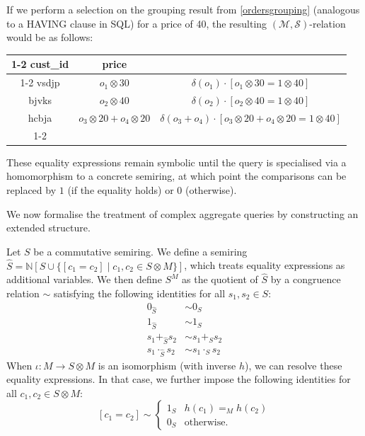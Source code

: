 \documentclass[oneside, 11pt]{amsbook}
\theoremstyle{plain}
\theoremstyle{definition}
\theoremstyle{remark}
\begin{document}
\begin{exmpl}
    \label{ordersgroupingselect}
    If we perform a selection on the grouping result from \autoref{ordersgrouping} (analogous to a HAVING clause in SQL) for a price of 40, the resulting $(\mathcal{M}, \mathcal{S})$-relation would be as follows:

    \begin{center}
        \begin{tabular}{|c|c|c}
            \cline{1-2}
            cust\_id & price                             &                                                                            \\ \cline{1-2}
            vsdjp    & $o_1 \otimes 30$                  & $\delta(o_1)\cdot [o_1 \otimes 30 = 1 \otimes 40]$                         \\
            bjvks    & $o_2 \otimes 40$                  & $\delta(o_2) \cdot [o_2 \otimes 40 = 1 \otimes 40]$                        \\
            hcbja    & $o_3 \otimes 20 + o_4 \otimes 20$ & $\delta(o_3 + o_4) \cdot [o_3 \otimes 20 + o_4 \otimes 20 = 1 \otimes 40]$ \\ \cline{1-2}
        \end{tabular}
    \end{center}

    These equality expressions remain symbolic until the query is specialised via a homomorphism to a concrete semiring, at which point the comparisons can be replaced by $1$ (if the equality holds) or $0$ (otherwise).
\end{exmpl}

We now formalise the treatment of complex aggregate queries by constructing an extended structure.

\begin{defn}[$S^M$]
    Let $S$ be a commutative semiring. We define a semiring $\widehat{S} = \mathbb{N}[S \cup \{ [c_1 = c_2] \mid c_1, c_2 \in S \otimes M \}]$, which treats equality expressions as additional variables. We then define $S^M$ as the quotient of $\widehat{S}$ by a congruence relation $\sim$ satisfying the following identities for all $s_1,s_2 \in S$:
    \[
        \begin{aligned}
            0_{\widehat{S}}             & \sim 0_S             \\
            1_{\widehat{S}}             & \sim 1_S             \\
            s_1 +_{\widehat{S}} s_2     & \sim s_1 +_S s_2     \\
            s_1 \cdot_{\widehat{S}} s_2 & \sim s_1 \cdot_S s_2
        \end{aligned}
    \]
    When $\iota: M \to S \otimes M$ is an isomorphism (with inverse $h$), we can resolve these equality expressions. In that case, we further impose the following identities for all $c_1,c_2 \in S \otimes M$:
    \[
        [c_1 = c_2] \sim
        \begin{cases}
            1_S & h(c_1) =_M h(c_2) \\
            0_S & \text{otherwise.}
        \end{cases}
    \]
\end{defn}
\end{document}
